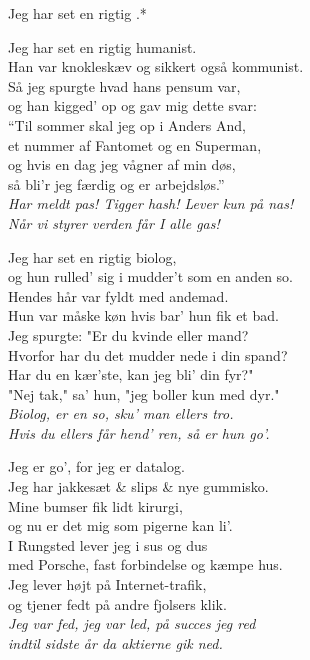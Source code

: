 \begin{song}{Jeg har set en rigtig .*}
  \begin{SBVerse}
    Jeg har set en rigtig humanist.\\
    Han var knokleskæv og sikkert også kommunist.\\
    Så jeg spurgte hvad hans pensum var,\\
    og han kigged’ op og gav mig dette svar:\\\medskip
    ``Til sommer skal jeg op i Anders And,\\
    et nummer af Fantomet og en Superman,\\
    og hvis en dag jeg vågner af min døs,\\
    så bli’r jeg færdig og er arbejdsløs.''\\\medskip
    \emph{Har meldt pas! Tigger hash! Lever kun på nas!\\
    Når vi styrer verden får I alle gas!}
  \end{SBVerse}

  \begin{SBVerse}
    Jeg har set en rigtig biolog,\\
    og hun rulled’ sig i mudder’t som en anden so.\\
    Hendes hår var fyldt med andemad.\\
    Hun var måske køn hvis bar’ hun fik et bad.\\\medskip
    Jeg spurgte: "Er du kvinde eller mand?\\
    Hvorfor har du det mudder nede i din spand?\\
    Har du en kær’ste, kan jeg bli’ din fyr?"\\
    "Nej tak," sa’ hun, "jeg boller kun med dyr."\\\medskip
    \emph{Biolog, er en so, sku’ man ellers tro.\\
    Hvis du ellers får hend’ ren, så er hun go’.}
  \end{SBVerse}

  \begin{SBVerse}
    Jeg er go’, for jeg er datalog.\\
    Jeg har jakkesæt \& slips \& nye gummisko.\\
    Mine bumser fik lidt kirurgi,\\
    og nu er det mig som pigerne kan li’.\\\medskip
    I Rungsted lever jeg i sus og dus\\
    med Porsche, fast forbindelse og kæmpe hus.\\
    Jeg lever højt på Internet-trafik,\\
    og tjener fedt på andre fjolsers klik.\\\medskip
    \emph{Jeg var fed, jeg var led, på succes jeg red\\
    indtil sidste år da aktierne gik ned.}
  \end{SBVerse}
\end{song}